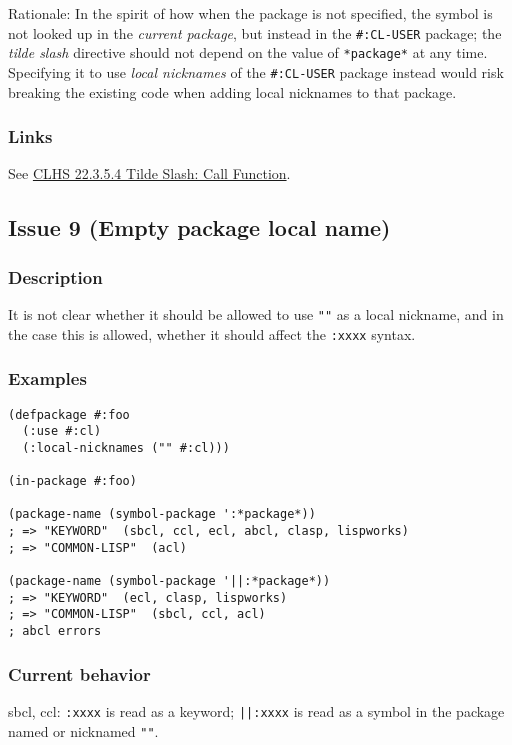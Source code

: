 \documentclass[11pt]{article}
\begin{document}
Rationale: In the spirit of how when the package is not specified, the symbol is
not looked up in the \emph{current package}, but instead in the \texttt{\#:CL-USER} package;
the \emph{tilde slash} directive should not depend on the value of \texttt{*package*} at any
time.  Specifying it to use \emph{local nicknames} of the \texttt{\#:CL-USER} package instead
would risk breaking the existing code when adding local nicknames to that package.
\subsubsection{Links}
\label{sec:org23cf66d}
See \href{https://www.lispworks.com/documentation/HyperSpec/Body/22\_ced.htm}{CLHS 22.3.5.4 Tilde Slash: Call Function}.

\subsection{Issue 9 (Empty package local name)}
\label{sec:org96a0ed7}
\subsubsection{Description}
\label{sec:org93be394}
It is not clear whether it should be allowed to use \texttt{""} as a local nickname,
and in the case this is allowed, whether it should affect the \texttt{:xxxx} syntax.
\subsubsection{Examples}
\label{sec:org29729b4}
\begin{verbatim}
(defpackage #:foo
  (:use #:cl)
  (:local-nicknames ("" #:cl)))

(in-package #:foo)

(package-name (symbol-package ':*package*))
; => "KEYWORD"  (sbcl, ccl, ecl, abcl, clasp, lispworks)
; => "COMMON-LISP"  (acl)

(package-name (symbol-package '||:*package*))
; => "KEYWORD"  (ecl, clasp, lispworks)
; => "COMMON-LISP"  (sbcl, ccl, acl)
; abcl errors
\end{verbatim}
\subsubsection{Current behavior}
\label{sec:org3e9b33b}
sbcl, ccl:
\texttt{:xxxx} is read as a keyword;
\texttt{||:xxxx} is read as a symbol in the package named or nicknamed \texttt{""}.
\end{document}
